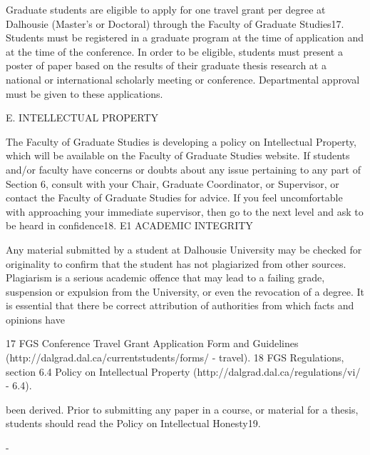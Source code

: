 Graduate students are eligible to apply for one travel grant per degree at Dalhousie (Master’s or Doctoral) through the Faculty of Graduate Studies17. Students must be registered in a graduate program at the time of application and at the time of the conference. In order to be eligible, students must present a poster of paper based on the results of their graduate thesis research at a national or international scholarly meeting or conference. Departmental approval must be given to these applications.


E.	INTELLECTUAL  PROPERTY

The Faculty of Graduate Studies is developing a policy on Intellectual Property, which will be available on the Faculty of Graduate Studies website.
If students and/or faculty have concerns or doubts about any issue pertaining to any part of Section 6, consult with your Chair, Graduate Coordinator, or Supervisor, or contact the Faculty of Graduate Studies for advice. If you feel uncomfortable with approaching your immediate supervisor, then go to the next level and ask to be heard in confidence18.
E1	ACADEMIC INTEGRITY

Any material submitted by a student at Dalhousie University may be checked for originality to confirm that the student has not plagiarized from other sources. Plagiarism is a serious academic offence that may lead to a failing grade, suspension or expulsion from the University, or even the revocation of a degree.  It is essential that there be correct attribution of authorities from which facts and opinions have




17 FGS Conference Travel Grant Application Form and Guidelines (http://dalgrad.dal.ca/currentstudents/forms/ - travel).
18 FGS Regulations, section 6.4 Policy on Intellectual Property (http://dalgrad.dal.ca/regulations/vi/ - 6.4).
 

been derived. Prior to submitting any paper in a course, or material for a thesis, students should read the Policy on Intellectual Honesty19.





-










































